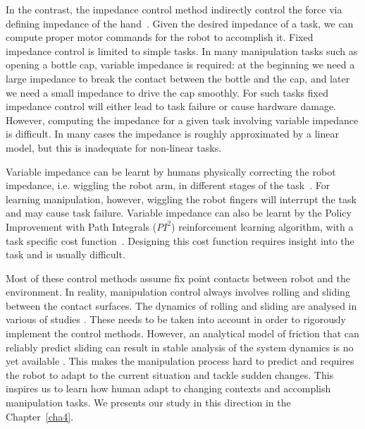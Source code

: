 In the contrast, the impedance control method indirectly control the force via defining impedance of the hand~\citep{howard2010transferring,wimbock2012comparison}. Given the desired impedance of a task, we can compute proper motor commands for the robot to accomplish it. Fixed impedance control is limited to simple tasks. In many manipulation tasks such as opening a bottle cap, variable impedance is required: at the beginning we need a large impedance to break the contact between the bottle and the cap, and later we need a small impedance to drive the cap smoothly. For such tasks fixed impedance control will either lead to task failure or cause hardware damage.
However, computing the impedance for a given task involving variable impedance is difficult.
In many cases the impedance is roughly approximated by a linear model, but this is inadequate for non-linear tasks.

Variable impedance can be learnt by humans physically correcting the robot impedance, i.e. wiggling the robot arm, in different stages of the task~\citep{kronander2012online}. For learning manipulation, however, wiggling the robot fingers will interrupt the task and may cause task failure.
Variable impedance can also be learnt by the Policy Improvement with Path Integrals ($PI^2$) reinforcement learning algorithm, with a task specific cost function~\citep{buchli2011learning}. Designing this cost function requires insight into the task and is usually difficult.

Most of these control methods assume fix point contacts between robot and the environment. In reality, manipulation control always involves rolling and sliding between the contact surfaces. The dynamics of rolling and sliding are analysed in various of studies \citep{howe1988sliding,montana1988kinematics}. These needs to be taken into account in order to rigorously implement the control methods. However, an analytical model of friction that can reliably predict sliding can result in stable analysis of the system dynamics is no yet available \citep{bicchi2001robotic}. This makes the manipulation process hard to predict and requires the robot to adapt to the current situation and tackle sudden changes. This inspires us to learn how human adapt to changing contexts and accomplish manipulation tasks. We presents our study in this direction in the Chapter~\ref{cha4}.



